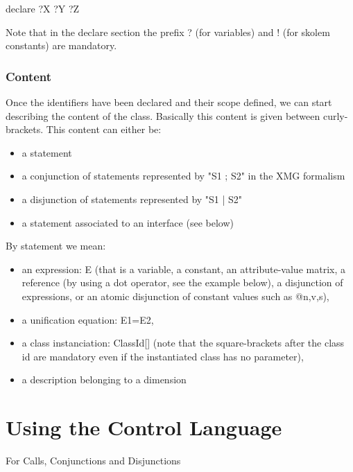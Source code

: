 \documentclass[11pt,fleqn]{book} %
\begin{document}
\begin{theorem}
declare ?X ?Y ?Z
\end{theorem}
Note that in the declare section the prefix ? (for variables) and ! (for skolem constants) are mandatory. 

\subsection{Content}
Once the identifiers have been declared and their scope defined, we can start describing the content of the class. Basically this content is given between curly-brackets. This content can either be:
\begin{itemize}
\item    a statement
\item    a conjunction of statements represented by "S1 ; S2" in the XMG formalism
\item    a disjunction of statements represented by "S1 | S2"
\item    a statement associated to an interface (see below) 
\end{itemize}
By statement we mean:

\begin{itemize}
\item    an expression: E (that is a variable, a constant, an attribute-value matrix, a reference (by using a dot operator, see the example below), a disjunction of expressions, or an atomic disjunction of constant values such as @{n,v,s}),
\item    a unification equation: E1=E2,
\item    a class instanciation: ClassId[] (note that the square-brackets after the class id are mandatory even if the instantiated class has no parameter),
\item a description belonging to a dimension
\end{itemize} 

\chapter{Using the Control Language}

For Calls, Conjunctions and Disjunctions
\end{document}
